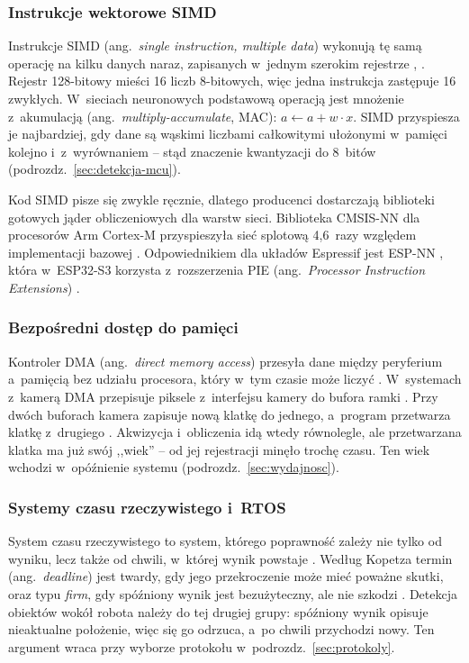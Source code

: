 \subsubsection*{Instrukcje wektorowe SIMD}

Instrukcje SIMD (ang.~\textit{single instruction, multiple data}) wykonują
tę samą operację na kilku danych naraz, zapisanych w~jednym szerokim rejestrze
\cite{hennessy_2019}, \cite{marwedel_2021}.
Rejestr 128-bitowy mieści 16 liczb 8-bitowych, więc jedna instrukcja zastępuje
16 zwykłych. W~sieciach neuronowych podstawową operacją jest mnożenie
z~akumulacją (ang.~\textit{multiply-accumulate}, MAC): $a \leftarrow a + w
\cdot x$. SIMD przyspiesza je najbardziej, gdy dane są wąskimi liczbami
całkowitymi ułożonymi w~pamięci kolejno i~z~wyrównaniem
\cite{hennessy_2019} -- stąd znaczenie kwantyzacji do 8~bitów
(podrozdz.~\ref{sec:detekcja-mcu}).

Kod SIMD pisze się zwykle ręcznie, dlatego producenci dostarczają biblioteki
gotowych jąder obliczeniowych dla warstw sieci. Biblioteka CMSIS-NN dla
procesorów Arm Cortex-M przyspieszyła sieć splotową 4,6~razy względem
implementacji bazowej \cite{lai_2018}. Odpowiednikiem dla układów
Espressif jest ESP-NN \cite{espressif_espnn}, która w~ESP32-S3 korzysta
z~rozszerzenia PIE (ang.~\textit{Processor Instruction Extensions})
\cite{espressif_esp32s3_trm}.

\subsubsection*{Bezpośredni dostęp do pamięci}

Kontroler DMA (ang.~\textit{direct memory access}) przesyła dane między
peryferium a~pamięcią bez udziału procesora, który w~tym czasie może liczyć
\cite{wolf_2017}. W~systemach z~kamerą DMA przepisuje piksele
z~interfejsu kamery do bufora ramki \cite{espressif_esp32s3_trm}.
Przy dwóch buforach kamera zapisuje nową klatkę do jednego, a~program
przetwarza klatkę z~drugiego \cite{espressif_esp32camera}. Akwizycja
i~obliczenia idą wtedy równolegle, ale przetwarzana klatka ma już swój
,,wiek'' -- od jej rejestracji minęło trochę czasu. Ten wiek wchodzi
w~opóźnienie systemu (podrozdz.~\ref{sec:wydajnosc}).

\subsubsection*{Systemy czasu rzeczywistego i~RTOS}

System czasu rzeczywistego to system, którego poprawność zależy nie tylko od
wyniku, lecz także od chwili, w~której wynik powstaje
\cite{kopetz_2011}. Według Kopetza termin
(ang.~\textit{deadline}) jest twardy, gdy jego przekroczenie może mieć poważne
skutki, oraz typu \textit{firm}, gdy spóźniony wynik jest bezużyteczny, ale
nie szkodzi \cite{kopetz_2011}. Detekcja obiektów wokół robota
należy do tej drugiej grupy: spóźniony wynik opisuje nieaktualne położenie,
więc się go odrzuca, a~po chwili przychodzi nowy. Ten argument wraca przy
wyborze protokołu w~podrozdz.~\ref{sec:protokoly}.

